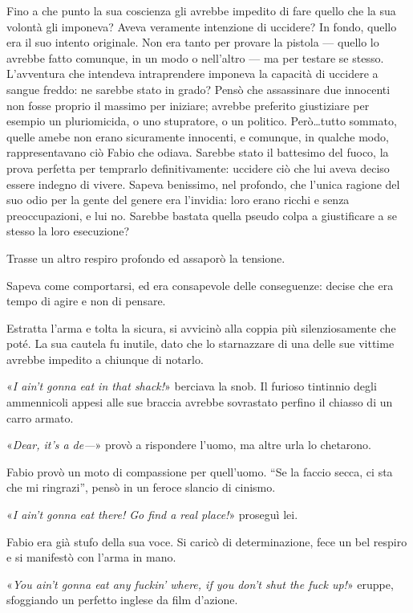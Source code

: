 Fino a che punto la sua coscienza gli avrebbe impedito di fare quello che la sua volontà gli imponeva? Aveva veramente intenzione di uccidere? In fondo, quello era il suo intento originale. Non era tanto per provare la pistola --- quello lo avrebbe fatto comunque, in un modo o nell'altro --- ma per testare se stesso. L'avventura che intendeva intraprendere imponeva la capacità di uccidere a sangue freddo: ne sarebbe stato in grado? Pensò che assassinare due innocenti non fosse proprio il massimo per iniziare; avrebbe preferito giustiziare per esempio un pluriomicida, o uno stupratore, o un politico. Però\ldots \thinspace tutto sommato, quelle amebe non erano sicuramente innocenti, e comunque, in qualche modo, rappresentavano ciò Fabio che odiava. Sarebbe stato il battesimo del fuoco, la prova perfetta per temprarlo definitivamente: uccidere ciò che lui aveva deciso essere indegno di vivere. Sapeva benissimo, nel profondo, che l'unica ragione del suo odio per la gente del genere era l'invidia: loro erano ricchi e senza preoccupazioni, e lui no. Sarebbe bastata quella pseudo colpa a giustificare a se stesso la loro esecuzione? 

Trasse un altro respiro profondo ed assaporò la tensione. 

Sapeva come comportarsi, ed era consapevole delle conseguenze: decise che era tempo di agire e non di pensare.

Estratta l'arma e tolta la sicura, si avvicinò alla coppia più silenziosamente che poté. La sua cautela fu inutile, dato che lo starnazzare di una delle sue vittime avrebbe impedito a chiunque di notarlo.

«\textit{I ain't gonna eat in that shack!}» berciava la snob. Il furioso tintinnio degli ammennicoli appesi alle sue braccia avrebbe sovrastato perfino il chiasso di un carro armato.

«\textit{Dear, it's a de---}» provò a rispondere l'uomo, ma altre urla lo chetarono.

Fabio provò un moto di compassione per quell'uomo. ``Se la faccio secca, ci sta che mi ringrazi'', pensò in un feroce slancio di cinismo.

«\textit{I ain't gonna eat there! Go find a real place!}» proseguì lei.

Fabio era già stufo della sua voce. Si caricò di determinazione, fece un bel respiro e si manifestò con l'arma in mano.

«\textit{You ain't gonna eat any fuckin' where, if you don't shut the fuck up!}» eruppe, sfoggiando un perfetto inglese da film d'azione.

